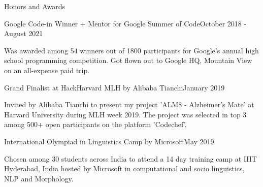 \documentclass[
	a4paper, %
	10pt, %
]{resume} %
\begin{document}
\begin{rSection}{Honors and Awards}

	\begin{achSubsection}{Google Code-in Winner + Mentor for Google Summer of Code}{October 2018 - August 2021}
		\item Was awarded among 54 winners out of 1800 participants for Google's annual high school programming competition. Got flown out to Google HQ, Mountain View on an all-expense paid trip.
	\end{achSubsection}




	\begin{achSubsection}{Grand Finalist at HackHarvard MLH by Alibaba Tianchi}{January 2019}
		\item Invited by Alibaba Tianchi to present my project 'ALM8 - Alzheimer's Mate' at Harvard University during MLH week 2019. The project was selected in top 3 among 500+ open participants on the platform 'Codechef'.
	\end{achSubsection}


	\begin{achSubsection}{International Olympiad in Linguistics Camp by Microsoft}{May 2019}
		\item Chosen among 30 students across India to attend a 14 day training camp at IIIT Hyderabad, India hosted by Microsoft in computational and socio linguistics, NLP and Morphology.
	\end{achSubsection}

\end{rSection}




\end{document}
